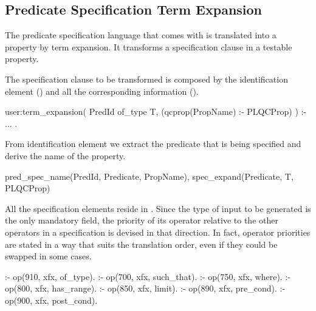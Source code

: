 \subsection{Predicate Specification Term Expansion}

The predicate specification language that comes with \plqc{} is
translated into a \plqc{} property by term expansion.
%
It transforms a specification clause in a testable property.


The specification clause to be transformed is composed by the
identification element () and all the corresponding
information ().
%
\begin{yapcode}
user:term_expansion(
      PredId of_type T,
      (qcprop(PropName) :- PLQCProp) ) :-
  ...
.
\end{yapcode}
%
From identification element we extract the predicate that is being
specified and derive the name of the property.
%
\begin{yapcode}
  pred_spec_name(PredId, Predicate, PropName),
  spec_expand(Predicate, T, PLQCProp)
\end{yapcode}
%
All the specification elements reside in .
%
Since the type of input to be generated is the only mandatory field, the
priority of its operator relative to the other operators in a
specification is devised in that direction.
%
In fact, operator priorities are stated in a way that suits the
translation order, even if they could be swapped in some cases.
%
\begin{yapcode}
:- op(910, xfx, of_type).
:- op(700, xfx, such_that).
:- op(750, xfx, where).
:- op(800, xfx, has_range).
:- op(850, xfx, limit).
:- op(890, xfx, pre_cond).
:- op(900, xfx, post_cond).
\end{yapcode}




\begin{yapcode}
\end{yapcode}

\begin{yapcode}
\end{yapcode}

\begin{yapcode}
\end{yapcode}

\begin{yapcode}
\end{yapcode}

